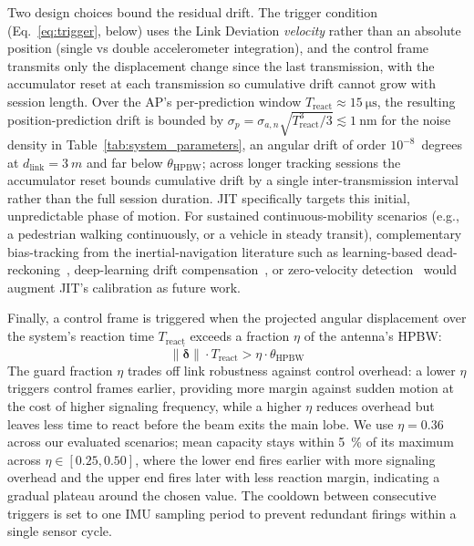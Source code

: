 \documentclass[fleqn,10pt]{wlscirep}
\newcommand{\rev}[1]{#1}
\begin{document}
\rev{Two design choices bound the residual drift. The trigger condition (Eq.~\ref{eq:trigger}, below) uses the Link Deviation \emph{velocity} rather than an absolute position (single vs double accelerometer integration), and the control frame transmits only the displacement change since the last transmission, with the accumulator reset at each transmission so cumulative drift cannot grow with session length. Over the AP's per-prediction window $T_{\text{react}} \approx \SI{15}{\micro\second}$, the resulting position-prediction drift is bounded by $\sigma_{p} = \sigma_{a,n}\sqrt{T_{\text{react}}^{3}/3} \lesssim \SI{1}{\nano\meter}$ for the noise density in Table~\ref{tab:system_parameters}, an angular drift of order $10^{-8}$~degrees at $d_{\text{link}} = \SI{3}{m}$ and far below $\theta_{\text{HPBW}}$; across longer tracking sessions the accumulator reset bounds cumulative drift by a single inter-transmission interval rather than the full session duration. JIT specifically targets this initial, unpredictable phase of motion. For sustained continuous-mobility scenarios (e.g., a pedestrian walking continuously, or a vehicle in steady transit), complementary bias-tracking from the inertial-navigation literature such as learning-based dead-reckoning~\cite{Brossard2020AIIMU}, deep-learning drift compensation~\cite{Chen2024DLInertial}, or zero-velocity detection~\cite{Skog2010ZUPT} would augment JIT's calibration as future work.}

Finally, a control frame is triggered when the projected angular displacement over the system's reaction time $T_{\text{react}}$ exceeds a fraction $\eta$ of the antenna's HPBW:
\begin{equation}
    \|\dot{\boldsymbol{\delta}}\| \cdot T_{\text{react}} > \eta \cdot \theta_{\text{HPBW}}
    \rev{\label{eq:trigger}}
\end{equation}
The guard fraction $\eta$ trades off link robustness against control overhead: a lower $\eta$ triggers control frames earlier, providing more margin against sudden motion at the cost of higher signaling frequency, while a higher $\eta$ reduces overhead but leaves less time to react before the beam exits the main lobe. We use $\eta = 0.36$ across our evaluated scenarios; \rev{mean capacity stays within \SI{5}{\percent} of its maximum across $\eta \in [0.25, 0.50]$, where the lower end fires earlier with more signaling overhead and the upper end fires later with less reaction margin, indicating a gradual plateau around the chosen value. The cooldown between consecutive triggers is set to one IMU sampling period to prevent redundant firings within a single sensor cycle.}
\end{document}
